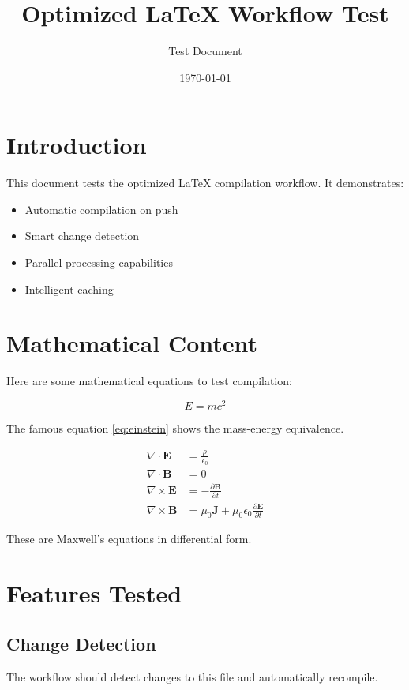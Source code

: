 \documentclass{article}
\title{Optimized LaTeX Workflow Test}
\author{Test Document}
\date{\today}
\begin{document}
\maketitle

\tableofcontents

\section{Introduction}

This document tests the optimized LaTeX compilation workflow. It demonstrates:

\begin{itemize}
    \item Automatic compilation on push
    \item Smart change detection
    \item Parallel processing capabilities
    \item Intelligent caching
\end{itemize}

\section{Mathematical Content}

Here are some mathematical equations to test compilation:

\begin{equation}
    E = mc^2
    \label{eq:einstein}
\end{equation}

The famous equation \ref{eq:einstein} shows the mass-energy equivalence.

\begin{align}
    \nabla \cdot \mathbf{E} &= \frac{\rho}{\epsilon_0} \\
    \nabla \cdot \mathbf{B} &= 0 \\
    \nabla \times \mathbf{E} &= -\frac{\partial \mathbf{B}}{\partial t} \\
    \nabla \times \mathbf{B} &= \mu_0\mathbf{J} + \mu_0\epsilon_0\frac{\partial \mathbf{E}}{\partial t}
\end{align}

These are Maxwell's equations in differential form.

\section{Features Tested}

\subsection{Change Detection}
The workflow should detect changes to this file and automatically recompile.
\end{document}
